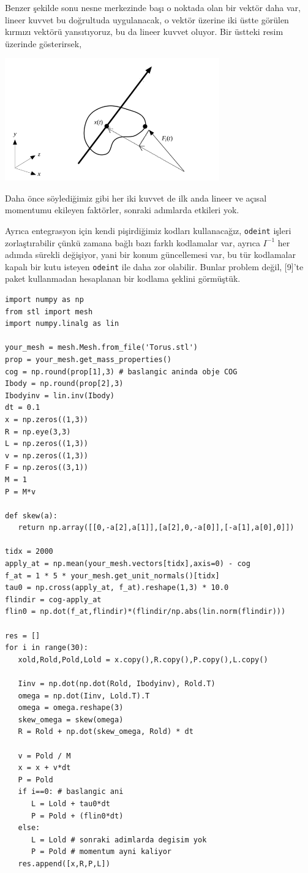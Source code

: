 \documentclass[12pt,fleqn]{article}\usepackage{../../common}
\begin{document}
Benzer şekilde sonu nesne merkezinde başı o noktada olan bir vektör daha var,
lineer kuvvet bu doğrultuda uygulanacak, o vektör üzerine iki üstte görülen
kırmızı vektörü yansıtıyoruz, bu da lineer kuvvet oluyor. Bir üstteki resim
üzerinde gösterirsek,

\includegraphics[width=25em]{compscieng_bpp32sim_rigbod_04.png}

Daha önce söylediğimiz gibi her iki kuvvet de ilk anda lineer ve açısal
momentumu ekileyen faktörler, sonraki adımlarda etkileri yok.

Ayrıca entegrasyon için kendi pişirdiğimiz kodları kullanacağız, \verb!odeint!
işleri zorlaştırabilir çünkü zamana bağlı bazı farklı kodlamalar var, ayrıca
$I^{-1}$ her adımda sürekli değişiyor, yani bir konum güncellemesi var, bu
tür kodlamalar kapalı bir kutu isteyen \verb!odeint! ile daha zor olabilir.
Bunlar problem değil, [9]'te paket kullanmadan hesaplanan bir
kodlama şeklini görmüştük.

\begin{verbatim}
import numpy as np
from stl import mesh
import numpy.linalg as lin

your_mesh = mesh.Mesh.from_file('Torus.stl')   
prop = your_mesh.get_mass_properties()
cog = np.round(prop[1],3) # baslangic aninda obje COG
Ibody = np.round(prop[2],3)
Ibodyinv = lin.inv(Ibody)
dt = 0.1
x = np.zeros((1,3))
R = np.eye(3,3)
L = np.zeros((1,3))
v = np.zeros((1,3))
F = np.zeros((3,1))
M = 1
P = M*v

def skew(a):
   return np.array([[0,-a[2],a[1]],[a[2],0,-a[0]],[-a[1],a[0],0]])

tidx = 2000
apply_at = np.mean(your_mesh.vectors[tidx],axis=0) - cog
f_at = 1 * 5 * your_mesh.get_unit_normals()[tidx]
tau0 = np.cross(apply_at, f_at).reshape(1,3) * 10.0
flindir = cog-apply_at
flin0 = np.dot(f_at,flindir)*(flindir/np.abs(lin.norm(flindir)))

res = []
for i in range(30):
   xold,Rold,Pold,Lold = x.copy(),R.copy(),P.copy(),L.copy()
   
   Iinv = np.dot(np.dot(Rold, Ibodyinv), Rold.T)
   omega = np.dot(Iinv, Lold.T).T
   omega = omega.reshape(3)
   skew_omega = skew(omega)
   R = Rold + np.dot(skew_omega, Rold) * dt

   v = Pold / M
   x = x + v*dt
   P = Pold
   if i==0: # baslangic ani
      L = Lold + tau0*dt
      P = Pold + (flin0*dt)
   else:      
      L = Lold # sonraki adimlarda degisim yok
      P = Pold # momentum ayni kaliyor
   res.append([x,R,P,L])
\end{verbatim}
\end{document}
